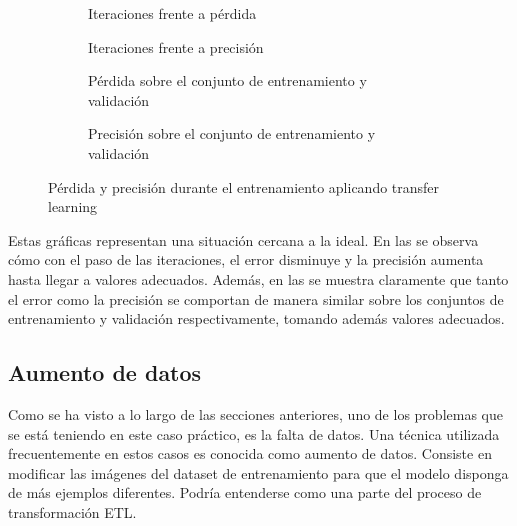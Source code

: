 			\begin{figure}[!h]
				\centering
				\begin{subfigure}{.4\textwidth}
					\centering
					
					\caption{Iteraciones frente a pérdida}
					\label{fig:tb_tl_a}
				\end{subfigure}\hfill
				\begin{subfigure}{.4\textwidth}
					\centering
					
					\caption{Iteraciones frente a precisión}
					\label{fig:tb_tl_b}
				\end{subfigure}
				\begin{subfigure}{.4\textwidth}
					\centering
					
					\caption{Pérdida sobre el conjunto de entrenamiento y validación}
					\label{fig:tb_tl_c}
				\end{subfigure}\hfill
				\begin{subfigure}{.4\textwidth}
					\centering
					
					\caption{Precisión sobre el conjunto de entrenamiento y validación}
					\label{fig:tb_tl_d}
				\end{subfigure}
				\caption{Pérdida y precisión durante el entrenamiento aplicando transfer learning}
				\label{fig:tb_tl}
			\end{figure}
			
			Estas gráficas representan una situación cercana a la ideal. En las  se observa cómo con el paso de las iteraciones, el error disminuye y la precisión aumenta hasta llegar a valores adecuados. Además, en las  se muestra claramente que tanto el error como la precisión se comportan de manera similar sobre los conjuntos de entrenamiento y validación respectivamente, tomando además valores adecuados. 
			
		\subsection{Aumento de datos}
		
			Como se ha visto a lo largo de las secciones anteriores, uno de los problemas que se está teniendo en este caso práctico, es la falta de datos. Una técnica utilizada frecuentemente en estos casos es conocida como aumento de datos. Consiste en modificar las imágenes del dataset de entrenamiento para que el modelo disponga de más ejemplos diferentes\cite{augm}. Podría entenderse como una parte del proceso de transformación ETL. \\
			
